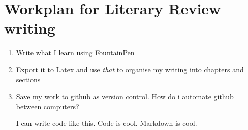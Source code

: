 \part{Workplan for Literary Review writing}
\label{workplanforliteraryreviewwriting}

\begin{enumerate}
\item Write what I learn using FountainPen

\item Export it to Latex and use \emph{that} to organise my writing into chapters and sections

\item Save my work to github as version control. How do i automate github between computers?

I can write code like this. Code is cool. Markdown is cool.

\end{enumerate}
